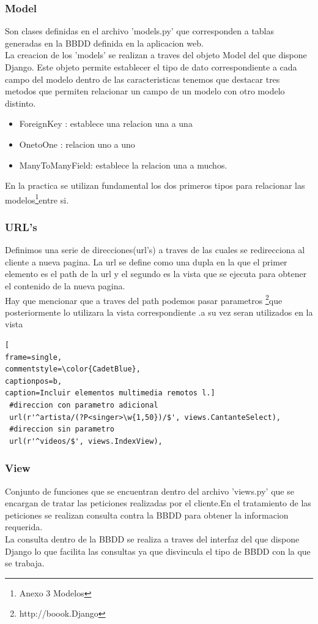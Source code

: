 \subsubsection{Model}
Son clases definidas en el archivo 'models.py' que corresponden a tablas generadas en la BBDD definida en la aplicacion web. 
\\La creacion de los 'models' se realizan a traves del objeto Model del que dispone Django. Este objeto permite establecer el tipo de dato correspondiente a  cada campo del modelo dentro de las caracteristicas tenemos que destacar  tres metodos que permiten relacionar un campo de un modelo con otro modelo distinto.
\begin{itemize}
\item ForeignKey :  establece una relacion una a una
\item OnetoOne : relacion uno a uno
\item ManyToManyField: establece la relacion una a muchos.
\end{itemize}
En la practica se utilizan fundamental los dos primeros tipos para relacionar las modelos\footnote{Anexo 3 Modelos}entre si.
\subsubsection{URL's}
Definimos una serie de direcciones(url's) a traves de las cuales se redirecciona al cliente a nueva pagina. La url se define como una dupla en la que el primer elemento es el path de la url  y el segundo es la vista que se ejecuta para obtener el contenido de la nueva pagina.
\\Hay que mencionar que a traves del path podemos pasar parametros \footnote{http://boook.Django}que posteriormente lo utilizara la vista correspondiente .a su vez seran utilizados en la vista 
\begin{lstlisting}[
frame=single,
commentstyle=\color{CadetBlue},
captionpos=b,
caption=Incluir elementos multimedia remotos l.]
 #direccion con parametro adicional
 url(r'^artista/(?P<singer>\w{1,50})/$', views.CantanteSelect),
 #direccion sin parametro
 url(r'^videos/$', views.IndexView),
\end{lstlisting}
\subsubsection{View}
Conjunto de funciones que se encuentran dentro del archivo 'views.py' que se encargan de tratar las peticiones realizadas por el cliente.En el tratamiento de las peticiones se realizan consulta contra la BBDD para obtener la informacion requerida.
\\La consulta dentro de la BBDD se realiza a traves del interfaz del que dispone Django lo que facilita las consultas ya que disvincula el tipo de BBDD con la que se trabaja.
